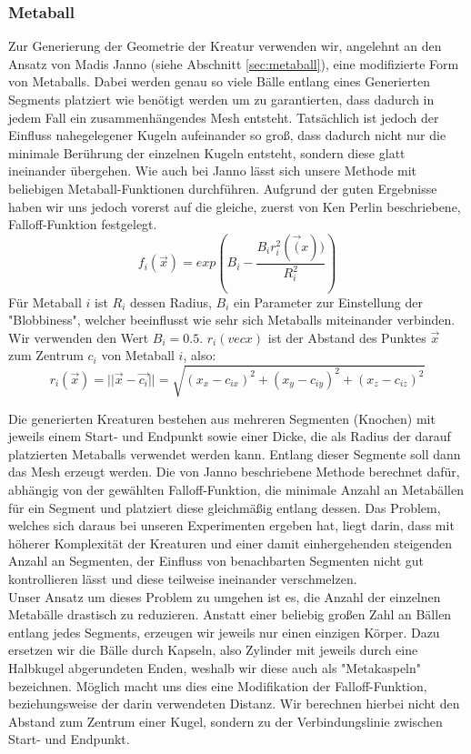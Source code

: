 \subsubsection{Metaball}
Zur Generierung der Geometrie der Kreatur verwenden wir, angelehnt an den Ansatz von Madis Janno \cite{Janno20182dCG} (siehe Abschnitt \ref{sec:metaball}), eine modifizierte Form von Metaballs. Dabei werden genau so viele Bälle entlang eines Generierten Segments platziert wie benötigt werden um zu garantierten, dass dadurch in jedem Fall ein zusammenhängendes Mesh entsteht. Tatsächlich ist jedoch der Einfluss nahegelegener Kugeln aufeinander so groß, dass dadurch nicht nur die minimale Berührung der einzelnen Kugeln entsteht, sondern diese glatt ineinander übergehen. Wie auch bei Janno lässt sich unsere Methode mit beliebigen Metaball-Funktionen durchführen. Aufgrund der guten Ergebnisse haben wir uns jedoch vorerst auf die gleiche, zuerst von Ken Perlin beschriebene, Falloff-Funktion festgelegt.
\[f_i(\vec{x}) = exp(B_i - \frac{B_ir_i^2(\vec(x))}{R_i^2})\]
Für Metaball $i$ ist $R_i$ dessen Radius, $B_i$ ein Parameter zur Einstellung der "Blobbiness", welcher beeinflusst wie sehr sich Metaballs miteinander verbinden. Wir verwenden den Wert $B_i = 0.5$. $r_i(vec{x})$ ist der Abstand des Punktes $\vec{x}$ zum Zentrum $c_i$ von Metaball $i$, also: \[r_i(\vec{x})=||\vec{x}-\vec{c_i}||=\sqrt{(x_x-c_{ix})^2+(x_y-c_{iy})^2+(x_z-c_{iz})^2}\]

Die generierten Kreaturen bestehen aus mehreren Segmenten (Knochen) mit jeweils einem Start- und Endpunkt sowie einer Dicke, die als Radius der darauf platzierten Metaballs verwendet werden kann. Entlang dieser Segmente soll dann das Mesh erzeugt werden. Die von Janno beschriebene Methode berechnet dafür, abhängig von der gewählten Falloff-Funktion, die minimale Anzahl an Metabällen für ein Segment und platziert diese gleichmäßig entlang dessen. Das Problem, welches sich daraus bei unseren Experimenten ergeben hat, liegt darin, dass mit höherer Komplexität der Kreaturen und einer damit einhergehenden steigenden Anzahl an Segmenten, der Einfluss von benachbarten Segmenten nicht gut kontrollieren lässt und diese teilweise ineinander verschmelzen. \\

Unser Ansatz um dieses Problem zu umgehen ist es, die Anzahl der einzelnen Metabälle drastisch zu reduzieren. Anstatt einer beliebig großen Zahl an Bällen entlang jedes Segments, erzeugen wir jeweils nur einen einzigen Körper. Dazu ersetzen wir die Bälle durch Kapseln, also Zylinder mit jeweils durch eine Halbkugel abgerundeten Enden, weshalb wir diese auch als "Metakaspeln" bezeichnen. Möglich macht uns dies eine Modifikation der Falloff-Funktion, beziehungsweise der darin verwendeten Distanz. Wir berechnen hierbei nicht den Abstand zum Zentrum einer Kugel, sondern zu der Verbindungslinie zwischen Start- und Endpunkt. \\

